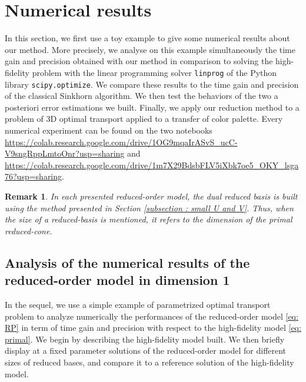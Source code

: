 \documentclass{article}
\newtheorem{rmk}[thm]{Remark}
\begin{document}
\section{Numerical results}\label{sec:num}
In this section, we first use a toy example to give some numerical results about our method. More precisely, we analyse on this example simultaneously the time gain and precision obtained with our method in comparison to solving the high-fidelity problem with the linear programming solver \texttt{linprog} of the Python library \texttt{scipy.optimize}. We compare these results to the time gain and precision of the classical Sinkhorn algorithm. We then test the behaviors of the two a posteriori error estimations we built.
%
 Finally, we apply our reduction method to a problem of 3D optimal transport applied to a transfer of color palette. 
%
Every numerical experiment can be found on the two notebooks \url{https://colab.research.google.com/drive/1OG9mqaIrASvS_ucC-V9sngRppLmtoOnr?usp=sharing} and \url{https://colab.research.google.com/drive/1m7X29BdsbFLV5iXbk7oe5_OKY_lsga76?usp=sharing}.
\begin{rmk}
   In each presented reduced-order model, the dual reduced basis is built using the method presented in Section \ref{subsection : small U and V}. Thus, when the size of a reduced-basis is mentioned, it refers to the dimension of the primal reduced-cone.
\end{rmk}
%





\subsection{Analysis of the numerical results of the reduced-order model in dimension 1}
%
In the sequel, we use a simple example of parametrized optimal transport problem to analyze numerically the performances of the reduced-order model \eqref{eq: RP} in term of time gain and precision with respect to the high-fidelity model \eqref{eq: primal}. We begin by describing the high-fidelity model built. We then briefly display at a fixed parameter solutions of the reduced-order model for different sizes of reduced bases, and compare it to a reference solution of the high-fidelity model.
%
\end{document}
